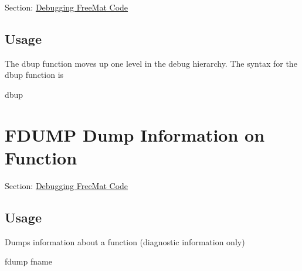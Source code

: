 Section\-: \hyperlink{sec_debug}{Debugging Free\-Mat Code} \hypertarget{vtkwidgets_vtkxyplotwidget_Usage}{}\subsection{Usage}\label{vtkwidgets_vtkxyplotwidget_Usage}
The {\ttfamily dbup} function moves up one level in the debug hierarchy. The syntax for the {\ttfamily dbup} function is \begin{DoxyVerb} dbup
\end{DoxyVerb}
 \hypertarget{debug_fdump}{}\section{F\-D\-U\-M\-P Dump Information on Function}\label{debug_fdump}
Section\-: \hyperlink{sec_debug}{Debugging Free\-Mat Code} \hypertarget{vtkwidgets_vtkxyplotwidget_Usage}{}\subsection{Usage}\label{vtkwidgets_vtkxyplotwidget_Usage}
Dumps information about a function (diagnostic information only) \begin{DoxyVerb}   fdump fname
\end{DoxyVerb}
 